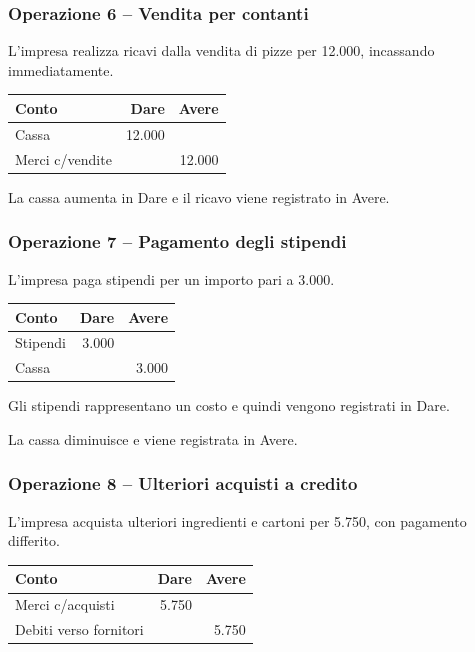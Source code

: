 \subsubsection*{Operazione 6 -- Vendita per contanti}

\noindent L'impresa realizza ricavi
dalla vendita di pizze per 12.000,
incassando immediatamente.

\begin{center}
\begin{tabular}{|l|r|r|}
\hline
\textbf{Conto} & \textbf{Dare} & \textbf{Avere} \\
\hline
Cassa & 12.000 & \\
\hline
Merci c/vendite & & 12.000 \\
\hline
\end{tabular}
\end{center}

\noindent La cassa aumenta in Dare
e il ricavo viene registrato in Avere.


\subsubsection*{Operazione 7 -- Pagamento degli stipendi}

\noindent L'impresa paga stipendi
per un importo pari a 3.000.

\begin{center}
\begin{tabular}{|l|r|r|}
\hline
\textbf{Conto} & \textbf{Dare} & \textbf{Avere} \\
\hline
Stipendi & 3.000 & \\
\hline
Cassa & & 3.000 \\
\hline
\end{tabular}
\end{center}

\noindent Gli stipendi rappresentano un costo
e quindi vengono registrati in Dare.

\medskip

\noindent La cassa diminuisce
e viene registrata in Avere.


\subsubsection*{Operazione 8 -- Ulteriori acquisti a credito}

\noindent L'impresa acquista ulteriori ingredienti
e cartoni per 5.750, con pagamento differito.

\begin{center}
\begin{tabular}{|l|r|r|}
\hline
\textbf{Conto} & \textbf{Dare} & \textbf{Avere} \\
\hline
Merci c/acquisti & 5.750 & \\
\hline
Debiti verso fornitori & & 5.750 \\
\hline
\end{tabular}
\end{center}

